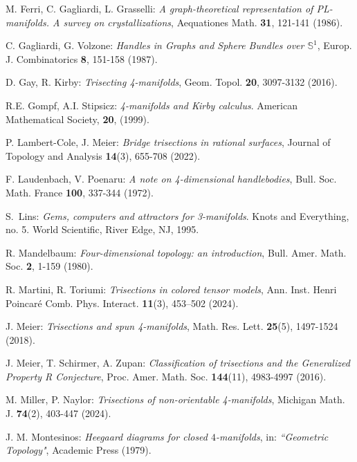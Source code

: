 \documentclass[12pt,a4paper]{article}
\begin{document}
\begin{thebibliography}{00}
{ 
M. Ferri, C. Gagliardi, L.  Grasselli: {\it A graph-theoretical representation of PL-manifolds. A survey on crystallizations}, Aequationes Math. {\bf 31}, 121-141 (1986).

C. Gagliardi, G. Volzone:  {\it Handles in Graphs and Sphere Bundles over $\mathbb S^1$},  Europ. J. Combinatorics  {\bf  8}, 151-158 (1987). 

D. Gay, R. Kirby:  {\it Trisecting 4-manifolds},  Geom. Topol.  {\bf 20}, 3097-3132 (2016).

R.E. Gompf, A.I. Stipsicz:  {\it 4-manifolds and Kirby calculus}. American Mathematical Society, {\bf 20}, (1999).  

P. Lambert-Cole, J. Meier: {\it Bridge trisections in rational surfaces},  Journal of Topology and Analysis {\bf 14}(3), 655-708 (2022). 

F. Laudenbach, V. Poenaru: {\it A note on 4-dimensional handlebodies}, Bull. Soc. Math. France  {\bf 100}, 337-344  (1972). 

 S.~Lins: {\it Gems, computers and attractors for 3-manifolds}. Knots and Everything, no. 5. World Scientific, River Edge, NJ, 1995.

\bibitem{[M]} 
R. Mandelbaum:  {\it Four-dimensional topology: an introduction},  Bull. Amer. Math. Soc. {\bf 2}, 1-159 (1980).

 R. Martini, R. Toriumi: {\it Trisections in colored tensor models},  Ann. Inst. Henri Poincar\'e Comb. Phys. Interact. {\bf 11}(3), 453–502 (2024).  %

J. Meier: {\it Trisections and spun 4-manifolds},   Math. Res. Lett. {\bf 25}(5), 1497-1524 (2018).   %

J. Meier, T. Schirmer, A. Zupan: {\it Classification of trisections and the Generalized Property R Conjecture},  Proc. Amer. Math. Soc. {\bf 144}(11), 4983-4997 (2016).

M. Miller, P. Naylor: {\it Trisections of non-orientable 4-manifolds}, Michigan Math. J.  {\bf 74}(2), 403-447 (2024). %

  J. M. Montesinos: {\it Heegaard diagrams for closed $4$-manifolds}, in:  {\em ``Geometric Topology"}, Academic Press (1979). %
 

}
\end{thebibliography}
\end{document}
